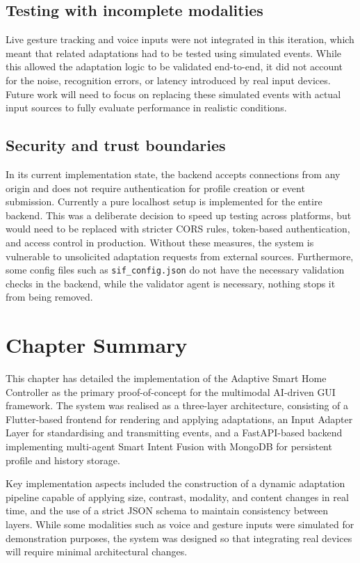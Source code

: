 \documentclass[openany]{book}
\begin{document}
\subsection{Testing with incomplete modalities}
Live gesture tracking and voice inputs were not integrated in this iteration, which meant that related adaptations had to be tested using simulated events. While this allowed the adaptation logic to be validated end-to-end, it did not account for the noise, recognition errors, or latency introduced by real input devices. Future work will need to focus on replacing these simulated events with actual input sources to fully evaluate performance in realistic conditions.

\subsection{Security and trust boundaries}
In its current implementation state, the backend accepts connections from any origin and does not require authentication for profile creation or event submission. Currently a pure localhost setup is implemented for the entire backend. This was a deliberate decision to speed up testing across platforms, but would need to be replaced with stricter CORS rules, token-based authentication, and access control in production. Without these measures, the system is vulnerable to unsolicited adaptation requests from external sources. Furthermore, some config files such as \texttt{sif\_config.json} do not have the necessary validation checks in the backend, while the validator agent is necessary, nothing stops it from being removed.

\section{Chapter Summary}
This chapter has detailed the implementation of the Adaptive Smart Home Controller as the primary proof-of-concept for the multimodal AI-driven GUI framework. The system was realised as a three-layer architecture, consisting of a Flutter-based frontend for rendering and applying adaptations, an Input Adapter Layer for standardising and transmitting events, and a FastAPI-based backend implementing multi-agent Smart Intent Fusion with MongoDB for persistent profile and history storage.

Key implementation aspects included the construction of a dynamic adaptation pipeline capable of applying size, contrast, modality, and content changes in real time, and the use of a strict JSON schema to maintain consistency between layers. While some modalities such as voice and gesture inputs were simulated for demonstration purposes, the system was designed so that integrating real devices will require minimal architectural changes.
\end{document}
